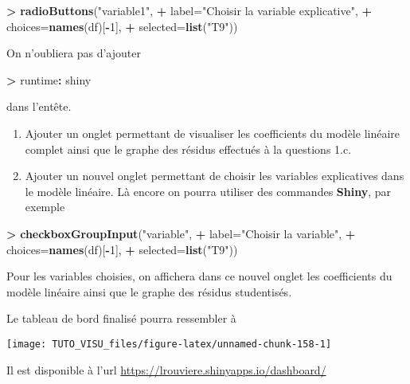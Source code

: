 \documentclass[]{article}
\newenvironment{Shaded}{\begin{snugshade}}{\end{snugshade}}
\newcommand{\DataTypeTok}[1]{\textcolor[rgb]{0.13,0.29,0.53}{#1}}
\newcommand{\DecValTok}[1]{\textcolor[rgb]{0.00,0.00,0.81}{#1}}
\newcommand{\KeywordTok}[1]{\textcolor[rgb]{0.13,0.29,0.53}{\textbf{#1}}}
\newcommand{\NormalTok}[1]{#1}
\newcommand{\OperatorTok}[1]{\textcolor[rgb]{0.81,0.36,0.00}{\textbf{#1}}}
\newcommand{\StringTok}[1]{\textcolor[rgb]{0.31,0.60,0.02}{#1}}
\providecommand{\tightlist}{%
  \setlength{\itemsep}{0pt}\setlength{\parskip}{0pt}}
\theoremstyle{definition}
\theoremstyle{definition}
\theoremstyle{definition}
\theoremstyle{remark}
\begin{document}
\begin{Shaded}
\begin{Highlighting}[]
\OperatorTok{>}\StringTok{ }\KeywordTok{radioButtons}\NormalTok{(}\StringTok{"variable1"}\NormalTok{,}
\OperatorTok{+}\StringTok{                    }\DataTypeTok{label=}\StringTok{"Choisir la variable explicative"}\NormalTok{,}
\OperatorTok{+}\StringTok{                    }\DataTypeTok{choices=}\KeywordTok{names}\NormalTok{(df)[}\OperatorTok{-}\DecValTok{1}\NormalTok{],}
\OperatorTok{+}\StringTok{                    }\DataTypeTok{selected=}\KeywordTok{list}\NormalTok{(}\StringTok{"T9"}\NormalTok{))}
\end{Highlighting}
\end{Shaded}

On n'oubliera pas d'ajouter

\begin{Shaded}
\begin{Highlighting}[]
\OperatorTok{>}\StringTok{ }\NormalTok{runtime}\OperatorTok{:}\StringTok{ }\NormalTok{shiny}
\end{Highlighting}
\end{Shaded}

dans l'entête.

\begin{enumerate}
\def\labelenumi{\alph{enumi}.}
\setcounter{enumi}{2}
\tightlist
\item
  Ajouter un onglet permettant de visualiser les coefficients du modèle linéaire complet ainsi que le graphe des résidus effectués à la questions 1.c.
\item
  Ajouter un nouvel onglet permettant de choisir les variables explicatives dans le modèle linéaire. Là encore on pourra utiliser des commandes \textbf{Shiny}, par exemple
\end{enumerate}

\begin{Shaded}
\begin{Highlighting}[]
\OperatorTok{>}\StringTok{ }\KeywordTok{checkboxGroupInput}\NormalTok{(}\StringTok{"variable"}\NormalTok{,}
\OperatorTok{+}\StringTok{                    }\DataTypeTok{label=}\StringTok{"Choisir la variable"}\NormalTok{,}
\OperatorTok{+}\StringTok{                    }\DataTypeTok{choices=}\KeywordTok{names}\NormalTok{(df)[}\OperatorTok{-}\DecValTok{1}\NormalTok{],}
\OperatorTok{+}\StringTok{                    }\DataTypeTok{selected=}\KeywordTok{list}\NormalTok{(}\StringTok{"T9"}\NormalTok{))}
\end{Highlighting}
\end{Shaded}

Pour les variables choisies, on affichera dans ce nouvel onglet les coefficients du modèle linéaire ainsi que le graphe des résidus studentisés.

Le tableau de bord finalisé pourra ressembler à

\begin{center}\texttt{[image: TUTO\_VISU\_files/figure-latex/unnamed-chunk-158-1]} \end{center}

Il est disponible à l'url \url{https://lrouviere.shinyapps.io/dashboard/}


\end{document}
